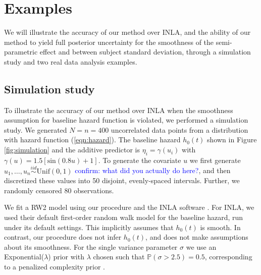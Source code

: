 \documentclass[]{article}
\newcommand{\alex}[1]{\textcolor{blue}{#1}}
\begin{document}
\section{Examples}\label{sec:example}

We will illustrate the accuracy of our method over INLA, and the ability of our method to yield full posterior uncertainty for the smoothness of the semi-parametric effect and between subject standard deviation, through a simulation study and two real data analysis examples.

\subsection{Simulation study}

To illustrate the accuracy of our method over INLA when the smoothness assumption for baseline hazard function is violated, we performed a simulation study. We generated $N = n = 400$ uncorrelated data points from a distribution with hazard function (\ref{eqn:hazard}). The baseline hazard $h_{0}(t)$ shown in Figure \ref{fig:simulation} and the additive predictor is $\eta_{i} = \gamma\left(u_{i}\right)$ with $\gamma(u) = 1.5 [ \text{sin}(0.8u) + 1 ]$. To generate the covariate $u$ we first generate $u_{1},\ldots,u_{n}\overset{iid}{\sim}\text{Unif}(0,1)$ \alex{confirm: what did you actually do here?}, and then discretized these values into 50 disjoint, evenly-spaced intervals. Further, we randomly censored $80$ observations. 

We fit a RW2 model using our procedure and the INLA software \citep{inla}. For INLA, we used their default first-order random walk model for the baseline hazard, run under its default settings. This implicitly assumes that $h_{0}(t)$ is smooth. In contrast, our procedure does not infer $h_{0}(t)$, and does not make assumptions about its smoothness. For the single variance parameter $\sigma$ we use an Exponential($\lambda$) prior with $\lambda$ chosen such that $\mathbb{P}\left( \sigma > 2.5\right) = 0.5$, corresponding to a penalized complexity prior \citep{pcprior}.
\end{document}
